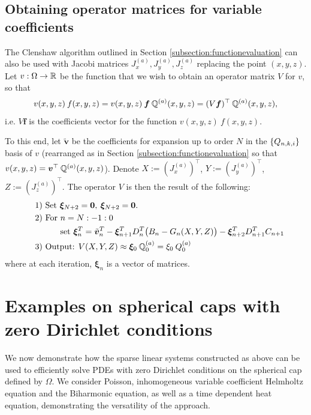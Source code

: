 \documentclass[11pt, oneside]{article}   	%
\begin{document}
\subsection{Obtaining operator matrices for variable coefficients}\label{subsection:operatorclenshaw}

The Clenshaw algorithm outlined in Section \ref{subsection:functionevaluation} can also be used with Jacobi matrices $J^{(a)}_x, J^{(a)}_y, J^{(a)}_z$ replacing the point $(x,y,z)$. Let $v : \Omega \to \mathbb{R}$ be the function that we wish to obtain an operator matrix $V$ for $v$, so that
\begin{align*}
	v(x,y,z) \: f(x,y,z) = v(x,y,z) \: \bm{f} \: \mathbb{{Q}}^{(a)}(x,y,z) = (V \bm{f})^\top \: \mathbb{{Q}}^{(a)}(x,y,z),
\end{align*}
i.e. $V \bm{f}$ is the coefficients vector for the function $v(x,y,z) \: f(x,y,z)$. 

To this end, let $\tilde{\bm{v}}$ be the coefficients for expansion up to order $N$ in the $\{Q_{n,k,i}\}$ basis of $v$ (rearranged as in Section \ref{subsection:functionevaluation} so that $v(x,y,z) = {\bm{v}}^\top \: \mathbb{{Q}}^{(a)}(x,y,z)$). Denote $X := (J_x^{(a)})^\top$, $Y := (J_y^{(a)})^\top$, $Z := (J_z^{(a)})^\top$. The operator $V$ is then the result of the following:
\begin{align*}
	\quad &\text{1) } \text{Set } \bm{\xi}_{N+2} = \bold{0}, \: \bm{\xi}_{N+2} = \bold{0}. \\
	\quad &\text{2) } \text{For } n = N:-1:0 \\
	\quad & \quad \quad \quad \text{set } \bm{\xi}_{n}^T = {\tilde{\bm{v}}_n}^T - \bm{\xi}_{n+1}^T D^T_n \big(B_n - G_n(X, Y, Z)\big) -  \bm{\xi}_{n+2}^T D^T_{n+1}C_{n+1} \\
	\quad &\text{3) } \text{Output: } V(X, Y, Z) \approx \bm{\xi}_{0} \: \mathbb{{Q}}^{(a)}_{0}  = \xi_{0} \: Q^{(a)}_0
\end{align*}
where at each iteration, $\bm{\xi}_n$ is a vector of matrices.



%
\section{Examples on spherical caps with zero Dirichlet conditions}\label{Section:Examples}

We now demonstrate how the sparse linear systems constructed as above can be used to efficiently solve PDEs with zero Dirichlet conditions on the spherical cap defined by $\Omega$. We consider Poisson, inhomogeneous variable coefficient Helmholtz equation and the Biharmonic equation, as well as a time dependent heat equation, demonstrating the versatility of the approach.
\end{document}
